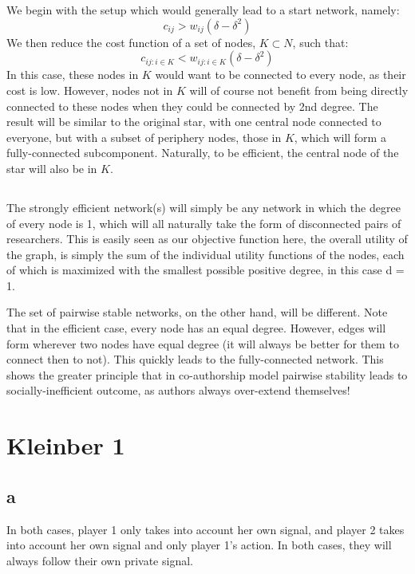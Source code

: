 \documentclass[a4paper,12pt]{article}
\begin{document}
\section{}
\subsection{}

We begin with the setup which would generally lead to a start network, namely:
%
$$
c_{ij} > w_{ij}(\delta - \delta^2)
$$
%
We then reduce the cost function of a set of nodes, $K \subset N$, such that:
%
$$
c_{ij: i \in K} < w_{ij: i \in K}(\delta - \delta^2)
$$
%
In this case, these nodes in $K$ would want to be connected to every node, as their cost is low. However, nodes not in $K$ will of course not benefit from being directly connected to these nodes when they could be connected by 2nd degree. The result will be similar to the original star, with one central node connected to everyone, but with a subset of periphery nodes, those in $K$, which will form a fully-connected subcomponent. Naturally, to be efficient, the central node of the star will also be in $K$.

\subsection{}
The strongly efficient network(s) will simply be any network in which the degree of every node is 1, which will all naturally take the form of disconnected pairs of researchers. This is easily seen as our objective function here, the overall utility of the graph, is simply the sum of the individual utility functions of the nodes, each of which is maximized with the smallest possible positive degree, in this case d = 1.

The set of pairwise stable networks, on the other hand, will be different. Note that in the efficient case, every node has an equal degree. However, edges will form wherever two nodes have equal degree (it will always be better for them to connect then to not). This quickly leads to the fully-connected network. This shows the greater principle that in co-authorship model pairwise stability leads to socially-inefficient outcome, as authors always over-extend themselves!

\section*{Kleinber 1}

\subsection*{a}
In both cases, player 1 only takes into account her own signal, and player 2 takes into account her own signal and only player 1's action. In both cases, they will always follow their own private signal.
\end{document}
